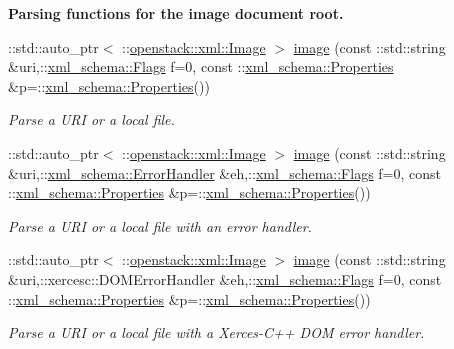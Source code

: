\begin{Indent}{\bf Parsing functions for the image document root.}\par
\begin{DoxyCompactItemize}
\item 
::std::auto\_\-ptr$<$ ::\hyperlink{classopenstack_1_1xml_1_1Image}{openstack::xml::Image} $>$ \hyperlink{namespaceopenstack_1_1xml_a4134f3721e40ef179e01bda7806e0733}{image} (const ::std::string \&uri,::\hyperlink{namespacexml__schema_affb4c227cbd9aa7453dd1dc5a1401943}{xml\_\-schema::Flags} f=0, const ::\hyperlink{namespacexml__schema_ad27ce19a7ee1d3b1064092648898f64c}{xml\_\-schema::Properties} \&p=::\hyperlink{namespacexml__schema_ad27ce19a7ee1d3b1064092648898f64c}{xml\_\-schema::Properties}())
\begin{DoxyCompactList}\small\item\em Parse a URI or a local file. \item\end{DoxyCompactList}\item 
::std::auto\_\-ptr$<$ ::\hyperlink{classopenstack_1_1xml_1_1Image}{openstack::xml::Image} $>$ \hyperlink{namespaceopenstack_1_1xml_a482d6cc7e3dd1d95b4607c6c9eea3777}{image} (const ::std::string \&uri,::\hyperlink{namespacexml__schema_ab1c9361bfd3b404eaabf0c31eded79dc}{xml\_\-schema::ErrorHandler} \&eh,::\hyperlink{namespacexml__schema_affb4c227cbd9aa7453dd1dc5a1401943}{xml\_\-schema::Flags} f=0, const ::\hyperlink{namespacexml__schema_ad27ce19a7ee1d3b1064092648898f64c}{xml\_\-schema::Properties} \&p=::\hyperlink{namespacexml__schema_ad27ce19a7ee1d3b1064092648898f64c}{xml\_\-schema::Properties}())
\begin{DoxyCompactList}\small\item\em Parse a URI or a local file with an error handler. \item\end{DoxyCompactList}\item 
::std::auto\_\-ptr$<$ ::\hyperlink{classopenstack_1_1xml_1_1Image}{openstack::xml::Image} $>$ \hyperlink{namespaceopenstack_1_1xml_a29ed87ee9a0392d4f56580be2d068aec}{image} (const ::std::string \&uri,::xercesc::DOMErrorHandler \&eh,::\hyperlink{namespacexml__schema_affb4c227cbd9aa7453dd1dc5a1401943}{xml\_\-schema::Flags} f=0, const ::\hyperlink{namespacexml__schema_ad27ce19a7ee1d3b1064092648898f64c}{xml\_\-schema::Properties} \&p=::\hyperlink{namespacexml__schema_ad27ce19a7ee1d3b1064092648898f64c}{xml\_\-schema::Properties}())
\begin{DoxyCompactList}\small\item\em Parse a URI or a local file with a Xerces-\/C++ DOM error handler. \item\end{DoxyCompactList}\item 

\end{DoxyCompactItemize}
\end{Indent}
